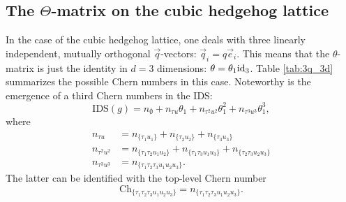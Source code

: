 \documentclass[
    aps,
    prb,
    twocolumn,
    floatfix,
    superscriptaddress,
	10pt
]{revtex4-2}
\begin{document}





\subsection{The \texorpdfstring{$\Theta$}{Theta}-matrix on the cubic hedgehog lattice}

In the case of the cubic hedgehog lattice, one deals with three linearly independent, mutually orthogonal $\vec{q}$-vectors: $\vec{q}_i = q\vec{e}_i$.
This means that the $\theta$-matrix is just the identity in $d=3$ dimensions: $\theta = \theta_1 \mathrm{id}_3$. 
Table \ref{tab:3q_3d} summarizes the possible Chern numbers in this case.
Noteworthy is the emergence of a third Chern numbers in the IDS:
\begin{equation}
	\mathrm{IDS}(g)
	=
	n_\emptyset
	+ n_{\tau u} \theta_1 
	+ n_{\tau^2 u^2} \theta_1^2
	+ n_{\tau^3 u^3} \theta_1^3,
\end{equation}
where 
\begin{align}
n_{\tau u}  
& = n_{\lbrace \tau_1 u_1 \rbrace}  + n_{\lbrace \tau_2 u_2 \rbrace} + n_{\lbrace \tau_3 u_3 \rbrace} 
\\
n_{\tau^2 u^2}  
& = n_{\lbrace \tau_1 \tau_2 u_1 u_2 \rbrace}  
+ n_{\lbrace \tau_1 \tau_3 u_1 u_3 \rbrace}   
+ n_{\lbrace \tau_2 \tau_3 u_2 u_3 \rbrace}   
\\
n_{\tau^3 u^3}  
& = n_{\lbrace \tau_1 \tau_2 \tau_3 u_1 u_2 u_3 \rbrace}.
\end{align}
The latter can be identified with the top-level Chern number
\begin{equation}
	\mathrm{Ch}_{\lbrace \tau_1 \tau_2 \tau_3 u_1 u_2 u_3 \rbrace}
	=
	n_{\lbrace \tau_1 \tau_2 \tau_3 u_1 u_2 u_3 \rbrace}.
\end{equation} 
\end{document}
